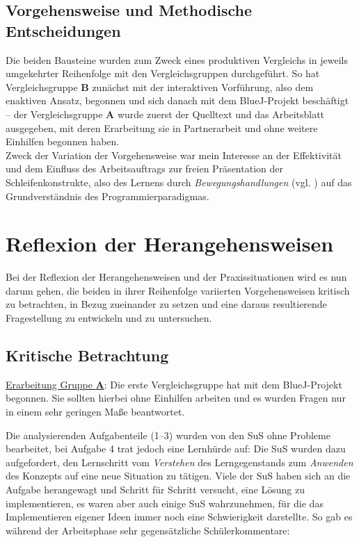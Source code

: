 \documentclass[paper=a4, DIV=13, BCOR=12mm, twoside=on, onecolumn=on, open = any, titlepage =on, parskip =half-, headsepline = on, footsepline = on, chapterprefix = on, sectionprefix = on, appendixprefix = off, fontsize = 11pt, numbers = noenddot, abstract = off]{scrreprt}
\begin{document}
\par \singlespacing
 \section{Vorgehensweise und Methodische Entscheidungen}
 \label{sec:vorgehensweisen}
\onehalfspacing
\enlargethispage{2ex}
Die beiden Bausteine wurden zum Zweck eines produktiven Vergleichs in jeweils umgekehrter Reihenfolge mit den Vergleichsgruppen durchgeführt. So hat Vergleichsgruppe \textsc{\textbf{B}} zunächst mit der interaktiven Vorführung, also dem enaktiven Ansatz, begonnen und sich danach mit dem BlueJ-Projekt beschäftigt -- der Vergleichsgruppe \textsc{\textbf{A}} wurde zuerst der Quelltext und das Arbeitsblatt ausgegeben, mit deren Erarbeitung sie in Partnerarbeit und ohne weitere Einhilfen begonnen haben. \\
Zweck der Variation der Vorgehensweise war mein Interesse an der Effektivität und dem Einfluss des Arbeitsauftrags zur freien Präsentation der Schleifenkonstrukte, also des Lernens durch \emph{Bewegungshandlungen} (vgl. \cite[S.183f.]{aebli:11}) auf das Grundverständnis des Programmierparadigmas.



\par \singlespacing
\chapter{Reflexion der Herangehensweisen}
\onehalfspacing
 Bei der Reflexion der Herangehensweisen und der Praxissituationen wird es nun darum gehen, die beiden in ihrer Reihenfolge variierten Vorgehensweisen kritisch zu betrachten, in Bezug zueinander zu setzen und eine daraus resultierende Fragestellung zu entwickeln und zu untersuchen.

\par \singlespacing
\section{Kritische Betrachtung}
\onehalfspacing

\underline{Erarbeitung Gruppe \textsc{\textbf{A}}}: Die erste Vergleichsgruppe hat mit dem BlueJ-Projekt begonnen. Sie sollten hierbei ohne Einhilfen arbeiten und es wurden Fragen nur in einem sehr geringen Maße beantwortet. 

Die analysierenden Aufgabenteile (1--3) wurden von den SuS ohne Probleme bearbeitet, bei Aufgabe 4 trat jedoch eine Lernhürde auf: Die SuS wurden dazu aufgefordert, den Lernschritt vom \emph{Verstehen} des Lerngegenstands zum \emph{Anwenden} des Konzepts auf eine neue Situation zu tätigen. Viele der SuS haben sich an die Aufgabe herangewagt und Schritt für Schritt versucht, eine Lösung zu implementieren, es waren aber auch einige SuS wahrzunehmen, für die das Implementieren eigener Ideen immer noch eine Schwierigkeit darstellte. So gab es während der Arbeitsphase sehr gegensätzliche Schülerkommentare:
\end{document}
